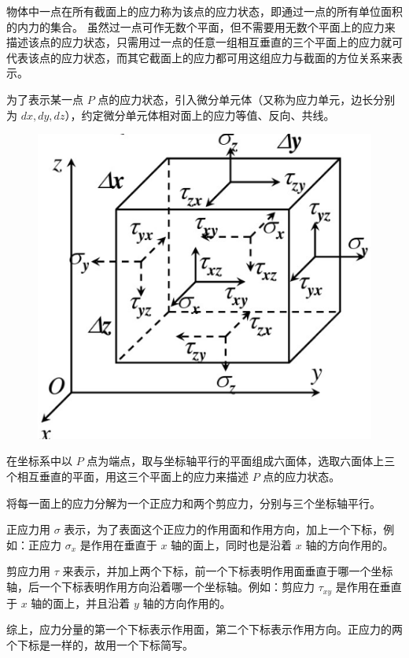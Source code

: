 \documentclass[12pt,a4paper]{article}
\begin{document}
物体中一点在所有截面上的应力称为该点的应力状态，即通过一点的所有单位面积的内力的集合。
虽然过一点可作无数个平面，但不需要用无数个平面上的应力来描述该点的应力状态，只需用过一点的任意一组相互垂直的三个平面上的应力就可代表该点的应力状态，而其它截面上的应力都可用这组应力与截面的方位关系来表示。

为了表示某一点 $P$ 点的应力状态，引入微分单元体（又称为应力单元，边长分别为 $dx,dy,dz$），约定微分单元体相对面上的应力等值、反向、共线。

\begin{figure}[H]
\centering
\includegraphics[scale=0.5]{./figures/17.png}
\caption{}
\end{figure}

在坐标系中以 $P$ 点为端点，取与坐标轴平行的平面组成六面体，选取六面体上三个相互垂直的平面，用这三个平面上的应力来描述 $P$ 点的应力状态。

将每一面上的应力分解为一个正应力和两个剪应力，分别与三个坐标轴平行。

正应力用 $\sigma$ 表示，为了表面这个正应力的作用面和作用方向，加上一个下标，例如：正应力 $\sigma_x$ 是作用在垂直于 $x$ 轴的面上，同时也是沿着 $x$ 轴的方向作用的。

剪应力用 $\tau$ 来表示，并加上两个下标，前一个下标表明作用面垂直于哪一个坐标轴，后一个下标表明作用方向沿着哪一个坐标轴。例如：剪应力 $\tau_{xy}$ 是作用在垂直于 $x$ 轴的面上，并且沿着 $y$ 轴的方向作用的。

综上，应力分量的第一个下标表示作用面，第二个下标表示作用方向。正应力的两个下标是一样的，故用一个下标简写。
\end{document}
